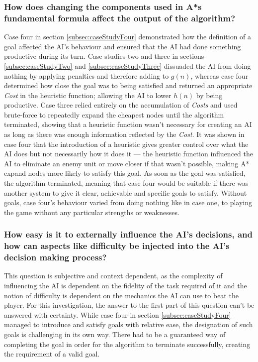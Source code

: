 \documentclass[11pt, a4paper]{report}
\begin{document}
\subsubsection{How does changing the components used in A*s fundamental formula affect the output of the algorithm?}

Case four in section \ref{subsec:caseStudyFour} demonstrated how the definition of a goal affected the AI's behaviour and ensured that the AI had done something productive during its turn. Case studies two and three in sections \ref{subsec:caseStudyTwo} and \ref{subsec:caseStudyThree} dissuaded the AI from doing nothing by applying penalties and therefore adding to $g(n)$, whereas case four determined how close the goal was to being satisfied and returned an appropriate \emph{Cost} in the heuristic function; allowing the AI to lower $h(n)$ by being productive. Case three relied entirely on the accumulation of \emph{Costs} and used brute-force to repeatedly expand the cheapest nodes until the algorithm terminated, showing that a heuristic function wasn't necessary for creating an AI as long as there was enough information reflected by the \emph{Cost}. It was shown in case four that the introduction of a heuristic gives greater control over what the AI does but not necessarily how it does it --- the heuristic function influenced the AI to eliminate an enemy unit or move closer if that wasn't possible, making A* expand nodes more likely to satisfy this goal. As soon as the goal was satisfied, the algorithm terminated, meaning that case four would be suitable if there was another system to give it clear, achievable and specific goals to satisfy. Without goals, case four's behaviour varied from doing nothing like in case one, to playing the game without any particular strengths or weaknesses.

\subsubsection{How easy is it to externally influence the AI's decisions, and how can aspects like difficulty be injected into the AI's decision making process?}

This question is subjective and context dependent, as the complexity of influencing the AI is dependent on the fidelity of the task required of it and the notion of difficulty is dependent on the mechanics the AI can use to beat the player. For this investigation, the answer to the first part of this question can't be answered with certainty. While case four in section \ref{subsec:caseStudyFour} managed to introduce and satisfy goals with relative ease, the designation of such goals is challenging in its own way. There had to be a guaranteed way of completing the goal in order for the algorithm to terminate successfully, creating the requirement of a valid goal. 
\end{document}
